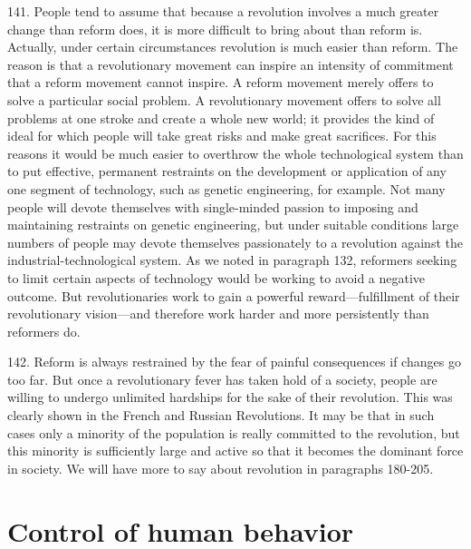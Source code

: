 \documentclass{article}
\begin{document}
141.  People tend to assume that because a revolution involves a much greater change than reform 
does,  it  is  more  difficult  to  bring  about  than  reform  is.   Actually,  under  certain  circumstances  
revolution is much easier than reform.  The reason is that a revolutionary movement can inspire 
an intensity of commitment that a reform movement cannot inspire.  A reform movement merely 
offers to solve a particular social problem.  A revolutionary movement offers to solve all problems 
at one stroke and create a whole new world; it provides the kind of ideal for which people will take 
great risks and make great sacrifices.  For this reasons it would be much easier to overthrow the 
whole  technological  system  than  to  put  effective,  permanent  restraints  on  the  development  or  
application of any one segment of technology, such as genetic engineering, for example.  Not many 
people will devote themselves with single-minded passion to imposing and maintaining restraints 
on  genetic  engineering,  but  under  suitable  conditions  large  numbers  of  people  may  devote  
themselves passionately to a revolution against the industrial-technological system.  As we noted 
in paragraph 132, reformers seeking to limit certain aspects of technology  would be working to 
avoid  a  negative  outcome.   But  revolutionaries  work  to  gain  a  powerful  reward—fulfillment  of 
their revolutionary vision—and therefore work harder and more persistently than reformers do. \vspace{\baselineskip} \newpage

142.  Reform is always restrained by the fear of painful consequences if changes go too far.  But 
once  a  revolutionary  fever  has  taken  hold  of  a  society,  people  are  willing  to  undergo  unlimited  
hardships  for  the  sake  of  their  revolution.   This  was  clearly  shown  in  the  French  and  Russian  
Revolutions.  It may be that in such cases only a minority of the population is really committed to 
the revolution, but this minority is sufficiently large and active so that it becomes the dominant 
force in society.  We will have more to say about revolution in paragraphs 180-205. 


\section{Control of human behavior}
\end{document}
